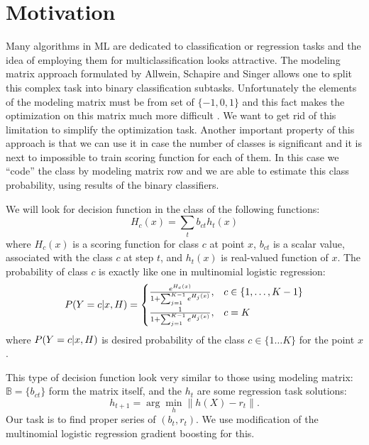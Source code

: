 \documentclass{article}
\begin{document}
\section{Motivation}

Many algorithms in ML are dedicated to classification or regression tasks and the idea of employing them for multiclassification looks attractive. The modeling matrix approach formulated by Allwein, Schapire and Singer \cite{Allwein00reducingmulticlass} allows one to split this complex task into binary classification subtasks. Unfortunately the elements of the modeling matrix must be from set of $\{-1,0,1\}$ and this fact makes the optimization on this matrix much more difficult \cite{modelmatrix2,Zhao_sparseoutput}. We want to get rid of this limitation to simplify the optimization task. Another important property of this approach is that we can use it in case the number of classes is significant and it is next to impossible to train scoring function for each of them. In this case we ``code'' the class by modeling matrix row and we are able to estimate this class probability, using results of the binary classifiers.

We will look for decision function in the class of the following functions:
\begin{equation}
H_c(x) = \sum_t b_{ct} h_t(x) 
\end{equation}
where $H_c(x)$ is a scoring function for class $c$ at point $x$, $b_{ct}$ is a scalar value, associated with the class $c$ at step $t$, and $h_t(x)$ is real-valued function of $x$. The probability of class $c$ is exactly like one in multinomial logistic regression:
\begin{equation}
  P(Y = c \arrowvert x, H) =
  \begin{cases}
    \frac{ e^{H_{c}(x)} }
       { 1+\sum_{j=1}^{K-1} e^{H_{j}(x)} }
    , & c \in \{1, \ldots, K-1 \} \\

    \frac{ 1 }
       { 1 + \sum_{j=1}^{K-1} e^{H_{j}(x)} }
    , & c=K
  \end{cases}\label{eq:MLR_model}
\end{equation}
where $P(Y = c \arrowvert x, H)$ is desired probability of the class $c \in \{1\ldots K\}$ for the point $x$.

This type of decision function look very similar to those using modeling matrix: $\mathbb{B} = \{b_{ct}\}$ form the matrix itself, and the $h_t$ are some regression task solutions:
\begin{equation}
h_{t+1} = \arg \min_h \|h(X) - r_t\|.
\end{equation}
Our task is to find proper series of $(b_t, r_t)$. We use modification of the multinomial logistic regression gradient boosting for this.
\end{document}
